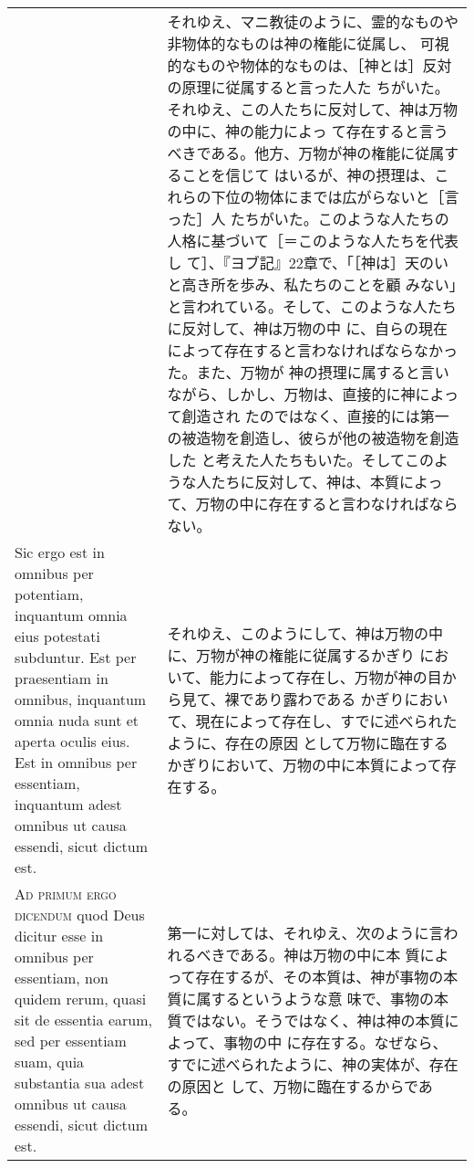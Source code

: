 \documentclass[10pt]{jsarticle} %
\begin{document}
\begin{longtable}{p{21em}p{21em}}
&

それゆえ、マニ教徒のように、霊的なものや非物体的なものは神の権能に従属し、
可視的なものや物体的なものは、［神とは］反対の原理に従属すると言った人た
ちがいた。それゆえ、この人たちに反対して、神は万物の中に、神の能力によっ
て存在すると言うべきである。他方、万物が神の権能に従属することを信じて
はいるが、神の摂理は、これらの下位の物体にまでは広がらないと［言った］人
たちがいた。このような人たちの人格に基づいて［＝このような人たちを代表し
て］、『ヨブ記』22章で、「［神は］天のいと高き所を歩み、私たちのことを顧
みない」と言われている。そして、このような人たちに反対して、神は万物の中
に、自らの現在によって存在すると言わなければならなかった。また、万物が
神の摂理に属すると言いながら、しかし、万物は、直接的に神によって創造され
たのではなく、直接的には第一の被造物を創造し、彼らが他の被造物を創造した
と考えた人たちもいた。そしてこのような人たちに反対して、神は、本質によっ
て、万物の中に存在すると言わなければならない。

\\

Sic ergo est in omnibus per potentiam, inquantum omnia eius potestati
 subduntur. Est per praesentiam in omnibus, inquantum omnia nuda sunt et
 aperta oculis eius. Est in omnibus per essentiam, inquantum adest
 omnibus ut causa essendi, sicut dictum est.

&

それゆえ、このようにして、神は万物の中に、万物が神の権能に従属するかぎり
 において、能力によって存在し、万物が神の目から見て、裸であり露わである
 かぎりにおいて、現在によって存在し、すでに述べられたように、存在の原因
 として万物に臨在するかぎりにおいて、万物の中に本質によって存在する。

\\

{\scshape Ad primum ergo dicendum} quod Deus dicitur esse in omnibus per
 essentiam, non quidem rerum, quasi sit de essentia earum, sed per
 essentiam suam, quia substantia sua adest omnibus ut causa essendi,
 sicut dictum est.

&

第一に対しては、それゆえ、次のように言われるべきである。神は万物の中に本
 質によって存在するが、その本質は、神が事物の本質に属するというような意
 味で、事物の本質ではない。そうではなく、神は神の本質によって、事物の中
 に存在する。なぜなら、すでに述べられたように、神の実体が、存在の原因と
 して、万物に臨在するからである。

\\


\end{longtable}
\end{document}

